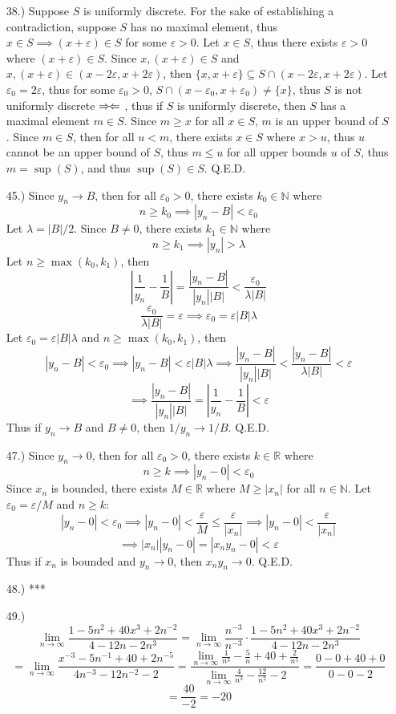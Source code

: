 \documentclass[12pt]{article}
\newcommand{\contradiction}{
    \ensuremath{{\Rightarrow\mspace{-2mu}\Leftarrow}}
}
\newcommand{\vertb}[1]{\left\vert#1\right\vert}
\newcommand{\e}{\varepsilon}
\newcommand{\lm}[1]{\displaystyle\lim_{#1}}
\begin{document}
\begin{itemize}
    \pagebreak
    \item [38.)] Suppose $S$ is uniformly discrete. For the sake of establishing a contradiction, suppose $S$ has no maximal element, thus $x\in S\implies(x+\e)\in S$ for some $\e>0$. Let $x\in S$, thus there exists $\e>0$ where $(x+\e)\in S$. Since $x,(x+\e)\in S$ and $x,(x+\e)\in(x-2\e,x+2\e)$, then $\{x,x+\e\}\subseteq S\cap(x-2\e,x+2\e)$. Let $\e_0=2\e$, thus for some $\e_0>0$, $S\cap(x-\e_0,x+\e_0)\ne\{x\}$, thus $S$ is not uniformly discrete\contradiction, thus if $S$ is uniformly discrete, then $S$ has a maximal element $m\in S$. Since $m\geq x$ for all $x\in S$, $m$ is an upper bound of $S$. Since $m\in S$, then for all $u<m$, there exists $x\in S$ where $x>u$, thus $u$ cannot be an upper bound of $S$, thus $m\leq u$ for all upper bounds $u$ of $S$, thus $m=\sup(S)$, and thus $\sup(S)\in S$. Q.E.D.

    \item [45.)] Since $y_n\to B$, then for all $\e_0>0$, there exists $k_0\in\mathbb{N}$ where
    \[n\geq k_0\implies\vertb{y_n-B}<\e_0\]
    Let $\lambda=\vertb{B}/2$. Since $B\neq0$, there exists $k_1\in\mathbb{N}$ where
    \[n\geq k_1\implies\vertb{y_n}>\lambda\]
    Let $n\geq\max(k_0,k_1)$, then
    \[\vertb{\frac{1}{y_n}-\frac{1}{B}}=\frac{\vertb{y_n-B}}{\vertb{y_n}\vertb{B}}<\frac{\e_0}{\lambda\vertb{B}}\]
    \[\frac{\e_0}{\lambda\vertb{B}}=\e\implies\e_0=\e\vertb{B}\lambda\]
    Let $\e_0=\e\vertb{B}\lambda$ and $n\geq\max(k_0,k_1)$, then
    \[\vertb{y_n-B}<\e_0\implies\vertb{y_n-B}<\e\vertb{B}\lambda\implies \frac{\vertb{y_n-B}}{\vertb{y_n}\vertb{B}}<\frac{\vertb{y_n-B}}{\lambda\vertb{B}}<\e\]
    \[\implies\frac{\vertb{y_n-B}}{\vertb{y_n}\vertb{B}}=\vertb{\frac{1}{y_n}-\frac{1}{B}}<\e\]
    Thus if $y_n\to B$ and $B\neq0$, then $1/y_n\to1/B$. Q.E.D.

    \item [47.)] Since $y_n\to0$, then for all $\e_0>0$, there exists $k\in\mathbb{R}$ where
    \[n\geq k\implies\vertb{y_n-0}<\e_0\]
    Since $x_n$ is bounded, there exists $M\in\mathbb{R}$ where $M\geq\vertb{x_n}$ for all $n\in\mathbb{N}$. Let $\e_0=\e/M$ and $n\geq k$:
    \[\vertb{y_n-0}<\e_0\implies\vertb{y_n-0}<\frac{\e}{M}\leq\frac{\e}{\vertb{x_n}}\implies\vertb{y_n-0}<\frac{\e}{\vertb{x_n}}\]
    \[\implies\vertb{x_n}\vertb{y_n-0}=\vertb{x_ny_n-0}<\e\]
    Thus if $x_n$ is bounded and $y_n\to0$, then $x_ny_n\to0$. Q.E.D.

    \item [48.)] ***

    \item [49.)]
    \[\lm{n\to\infty}\frac{1-5n^2+40x^3+2n^{-2}}{4-12n-2n^3}=\lm{n\to\infty}\frac{n^{-3}}{n^{-3}}\cdot\frac{1-5n^2+40x^3+2n^{-2}}{4-12n-2n^3}\]
    \[=\lm{n\to\infty}\frac{x^{-3}-5n^{-1}+40+2n^{-5}}{4n^{-3}-12n^{-2}-2}=\frac{\lm{n\to\infty}\frac{1}{n^3}-\frac{5}{n}+40+\frac{2}{n^5}}{\lm{n\to\infty}\frac{4}{n^3}-\frac{12}{n^2}-2}=\frac{0-0+40+0}{0-0-2}\]
    \[=\frac{40}{-2}=-20\]


\end{itemize}
\end{document}
